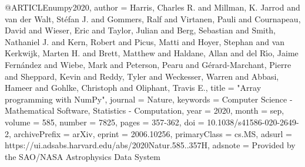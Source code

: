 
@ARTICLE{numpy2020,
       author = {{Harris}, Charles R. and {Millman}, K. Jarrod and {van der Walt}, St{\'e}fan J. and {Gommers}, Ralf and {Virtanen}, Pauli and {Cournapeau}, David and {Wieser}, Eric and {Taylor}, Julian and {Berg}, Sebastian and {Smith}, Nathaniel J. and {Kern}, Robert and {Picus}, Matti and {Hoyer}, Stephan and {van Kerkwijk}, Marten H. and {Brett}, Matthew and {Haldane}, Allan and {del R{\'\i}o}, Jaime Fern{\'a}ndez and {Wiebe}, Mark and {Peterson}, Pearu and {G{\'e}rard-Marchant}, Pierre and {Sheppard}, Kevin and {Reddy}, Tyler and {Weckesser}, Warren and {Abbasi}, Hameer and {Gohlke}, Christoph and {Oliphant}, Travis E.},
        title = "{Array programming with NumPy}",
      journal = {Nature},
     keywords = {Computer Science - Mathematical Software, Statistics - Computation},
         year = 2020,
        month = sep,
       volume = {585},
       number = {7825},
        pages = {357-362},
          doi = {10.1038/s41586-020-2649-2},
archivePrefix = {arXiv},
       eprint = {2006.10256},
 primaryClass = {cs.MS},
       adsurl = {https://ui.adsabs.harvard.edu/abs/2020Natur.585..357H},
      adsnote = {Provided by the SAO/NASA Astrophysics Data System}
}
